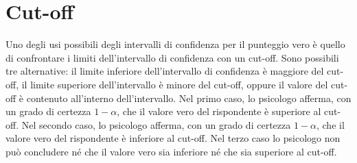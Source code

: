 \section{Cut-off}

Uno degli usi possibili degli intervalli di confidenza per il punteggio vero è quello di confrontare i limiti dell'intervallo di confidenza con un cut-off. Sono possibili tre alternative: il limite inferiore dell'intervallo di confidenza è maggiore del cut-off, il limite superiore dell'intervallo è minore del cut-off, oppure il valore del cut-off è contenuto all'interno dell'intervallo.
Nel primo caso, lo psicologo afferma, con un grado di certezza $1 -\alpha$, che il valore vero del rispondente è superiore al cut-off. Nel secondo caso, lo psicologo afferma, con un grado di certezza $1 -\alpha$, che il valore vero del rispondente è inferiore al cut-off. Nel terzo caso lo psicologo non può concludere né che il valore vero sia inferiore né che sia superiore al cut-off.



